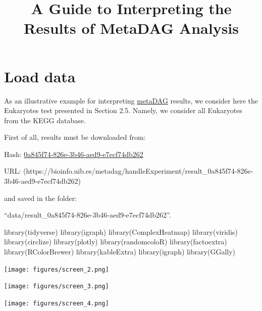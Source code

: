 \documentclass[
  letterpaper,
  DIV=11,
  numbers=noendperiod]{scrreprt}
\title{A Guide to Interpreting the Results of MetaDAG Analysis}
\author{}
\date{}
\newenvironment{Shaded}{}{}
\newcommand{\FunctionTok}[1]{\textcolor[rgb]{0.38,0.69,0.94}{#1}}
\newcommand{\NormalTok}[1]{\textcolor[rgb]{0.67,0.70,0.75}{#1}}
\renewcommand*\contentsname{Table of contents}
\newcommand\contentsname{Table of contents}
\begin{document}
\maketitle
\renewcommand*\contentsname{Table of contents}
{
\hypersetup{linkcolor=blue}
\setcounter{tocdepth}{2}
\tableofcontents
}

\hypertarget{load-data}{%
\chapter{Load data}\label{load-data}}

As an illustrative example for interpreting
\href{https://bioinfo.uib.es/metadag/}{metaDAG} results, we consider
here the Eukaryotes test presented in Section 2.5. Namely, we consider
all Eukaryotes from the KEGG database.

First of all, results must be downloaded from:

Hash:
\href{https://bioinfo.uib.es/metadag/handleExperiment/result_0a845f74-826e-3b46-aed9-e7ecf74db262}{0a845f74-826e-3b46-aed9-e7ecf74db262}

URL:
(https://bioinfo.uib.es/metadag/handleExperiment/result\_0a845f74-826e-3b46-aed9-e7ecf74db262)

and saved in the folder:

``data/result\_0a845f74-826e-3b46-aed9-e7ecf74db262''.

\begin{Shaded}
\begin{Highlighting}[]
\FunctionTok{library}\NormalTok{(tidyverse)}
\FunctionTok{library}\NormalTok{(igraph)}
\FunctionTok{library}\NormalTok{(ComplexHeatmap)}
\FunctionTok{library}\NormalTok{(viridis)}
\FunctionTok{library}\NormalTok{(circlize)}
\FunctionTok{library}\NormalTok{(plotly)}
\FunctionTok{library}\NormalTok{(randomcoloR)}
\FunctionTok{library}\NormalTok{(factoextra)}
\FunctionTok{library}\NormalTok{(RColorBrewer)}
\FunctionTok{library}\NormalTok{(kableExtra)}
\FunctionTok{library}\NormalTok{(igraph)}
\FunctionTok{library}\NormalTok{(GGally)}
\end{Highlighting}
\end{Shaded}

\texttt{[image: figures/screen\_2.png]}

\texttt{[image: figures/screen\_3.png]}

\texttt{[image: figures/screen\_4.png]}
\end{document}
